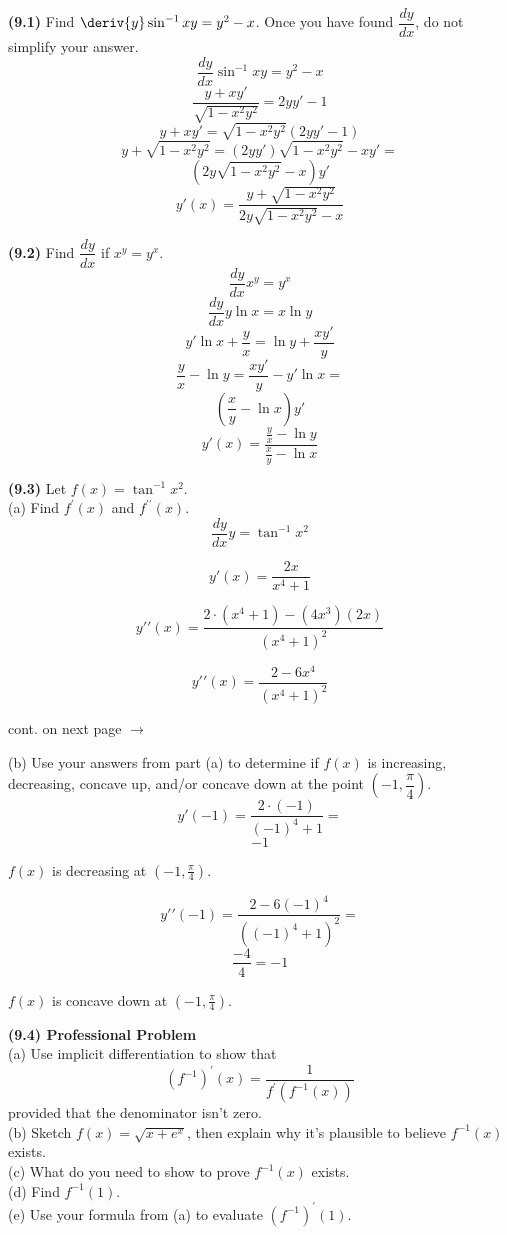 \documentclass{article}
\begin{document}
\textbf{(9.1)} Find $\deriv{y}\sin^{-1}{xy} = y^2-x$. Once you have found $\dfrac{dy}{dx}$, do not simplify your answer.
\[\frac{dy}{dx}\sin^{-1}{xy}=y^2-x\]
\[\frac{y+xy\prime}{\sqrt{1-x^2y^2} }= 2yy\prime-1\]
\[y+xy\prime =\sqrt{1-x^2y^2} (2yy\prime-1)\]
\[y+ \sqrt{1-x^2y^2} = (2yy\prime)\sqrt{1-x^2y^2}-xy\prime=\]
\[(2y\sqrt{1-x^2y^2}-x)y\prime\]
\[y\prime(x) = \frac{y+ \sqrt{1-x^2y^2}}{2y\sqrt{1-x^2y^2}-x}\]

\textbf{(9.2)} Find $\dfrac{dy}{dx}$ if $x^y=y^x$.
\[\frac{dy}{dx}x^y=y^x\]
\[\frac{dy}{dx}y\ln{x}=x\ln{y}\]
\[y\prime\ln{x}+\frac{y}{x}=\ln{y}+\frac{xy\prime}{y}\]
\[\frac{y}{x}-\ln{y}=\frac{xy\prime}{y}-y\prime\ln{x}=\]
\[(\frac{x}{y}-\ln{x})y\prime\]
\[y\prime(x)=\frac{\frac{y}{x}-\ln{y}}{\frac{x}{y}-\ln{x}}\]

\textbf{(9.3)} Let $f(x) = \tan^{-1}{x^2}$. \\

\indent
\indent
(a) Find $f^{\prime}(x)$ and $f^{\prime\prime}(x)$.
\[\frac{dy}{dx}y=\tan^{-1}{x^2}\]
\begin{tcolorbox}[colback=white]
\[y\prime(x)=\frac{2x}{x^4+1}\]
\end{tcolorbox}
\[y\prime\prime(x)=\frac{2\cdot(x^4+1)-(4x^3)(2x)}{{(x^4+1)}^2}\]
\begin{tcolorbox}[colback=white]
\[y\prime\prime(x)=\frac{2-6x^4}{{(x^4+1)}^2}\]
\end{tcolorbox} 
\begin{center}
cont. on next page $\rightarrow$
\end{center}


\newpage
\indent
\indent
(b) Use your answers from part (a) to determine if $f(x)$ is increasing, decreasing, concave
up, and/or concave down at the point $(-1,\dfrac{\pi}{4})$.
\[y\prime(-1)=\frac{2\cdot(-1)}{{(-1)}^4+1}=\]
\[-1\]
\begin{tcolorbox}[colback=white]
\center
$f(x)$ is decreasing at $(-1,\frac{\pi}{4})$.
\end{tcolorbox}
\[y\prime\prime(-1)=\frac{2-6{(-1)}^4}{{({(-1)}^4+1)}^2}=\]
\[\frac{-4}{4}=-1\]
\begin{tcolorbox}[colback=white]
\center
$f(x)$ is concave down at $(-1,\frac{\pi}{4})$.
\end{tcolorbox}
\newpage

\textbf{(9.4) Professional Problem} \\
\indent \indent (a) Use implicit differentiation to show that
\[{(f^{-1})}^{\prime}(x)=\frac{1}{f^{\prime}(f^{-1}(x))}\]
\indent \indent provided that the denominator isn't zero. \\
\indent \indent (b) Sketch $f(x)= \sqrt{x+e^x}$, then explain why it's plausible to believe $f^{-1}(x)$ exists.\\
\indent \indent (c) What do you need to show to prove $f^{-1}(x)$ exists.\\
\indent \indent (d) Find $f^{-1}(1)$.\\
\indent \indent (e) Use your formula from (a) to evaluate ${(f^{-1})}^\prime(1)$. \\
\newline
\newline
\end{document}
